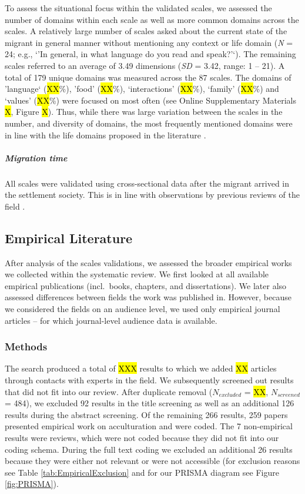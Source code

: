 To assess the situational focus within the validated scales, we assessed
the number of domains within each scale as well as more common domains
across the scales. A relatively large number of scales asked about the
current state of the migrant in general manner without mentioning any
context or life domain (\textit{N} = 24; e.g., `'In general, in what
language do you read and speak?'`). The remaining scales referred to an
average of 3.49 dimensions (\textit{SD} = 3.42, range: 1 -- 21). A total
of 179 unique domains was measured across the 87 scales. The domains of
'language` (\hl{XX}\%), 'food' (\hl{XX}\%), `interactions' (\hl{XX}\%),
`family' (\hl{XX}\%) and `values' (\hl{XX}\%) were focused on most often
(see Online Supplementary Materials \hl{X}, Figure \hl{X}). Thus, while
there was large variation between the scales in the number, and
diversity of domains, the most frequently mentioned domains were in line
with the life domains proposed in the literature
\citep[e.g.,][]{Arends-Toth2007}.

\vspace{1em}

\subparagraph{Migration time}

All scales were validated using cross-sectional data after the migrant
arrived in the settlement society. This is in line with observations by
previous reviews of the field \citep[e.g.,][]{Brown2011}.

\subsection{Empirical Literature}

After analysis of the scales validations, we assessed the broader
empirical works we collected within the systematic review. We first
looked at all available empirical publications (incl.~books, chapters,
and dissertations). We later also assessed differences between fields
the work was published in. However, because we considered the fields on
an audience level, we used only empirical journal articles -- for which
journal-level audience data is available.

\subsubsection{Methods}

The search produced a total of \hl{XXX} results to which we added
\hl{XX} articles through contacts with experts in the field. We
subsequently screened out results that did not fit into our review.
After duplicate removal (\(N_{excluded}\) = \hl{XX}, \(N_{screened}\) =
484), we excluded 92 results in the title screening as well as an
additional 126 results during the abstract screening. Of the remaining
266 results, 259 papers presented empirical work on acculturation and
were coded. The 7 non-empirical results were reviews, which were not
coded because they did not fit into our coding schema. During the full
text coding we excluded an additional 26 results because they were
either not relevant or were not accessible (for exclusion reasons see
Table \ref{tab:EmpiricalExclusion} and for our PRISMA diagram see Figure
\ref{fig:PRISMA}).

